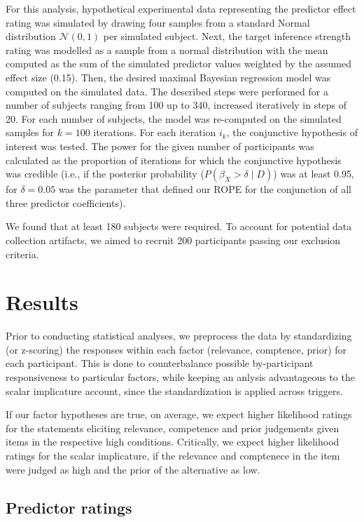 \documentclass{sp}
\begin{document}
For this analysis, hypothetical experimental data representing the predictor effect rating was simulated by drawing four samples from a standard Normal distribution $\mathcal{N}(0,1)$ per simulated subject. Next, the target inference strength rating was modelled as a sample from a normal distribution with the mean computed as the sum of the simulated predictor values weighted by the assumed effect size (0.15). Then, the desired maximal Bayesian regression model was computed on the simulated data. The described steps were performed for a number of subjects ranging from 100 up to 340, increased iteratively in steps of 20. For each number of subjects, the model was re-computed on the simulated samples for $k=100$ iterations. For each iteration $i_k$, the conjunctive hypothesis of interest was tested. 
The power for the given number of participants was calculated as the proportion of iterations for which the conjunctive hypothesis was credible (i.e., if the posterior probability ($P(\beta_X > \delta \mid D)$) was at least 0.95, for $\delta = 0.05$ was the parameter that defined our ROPE for the conjunction of all three predictor coefficients).

We found that at least 180 subjects were required. To account for potential data collection artifacts, we aimed to recruit 200 participants passing our exclusion criteria.

\section{Results}
Prior to conducting statistical analyses, we preprocess the data by standardizing (or z-scoring) the responses within each factor (relevance, comptence, prior) for each participant. This is done to counterbalance possible by-participant responsiveness to particular factors, while keeping an anlysis advantageous to the scalar implicature account, since the standardization is applied across triggers. 

If our factor hypotheses are true, on average, we expect higher likelihood ratings for the statements eliciting relevance, competence and prior judgements given items in the respective high conditions. Critically, we expect higher likelihood ratings for the scalar implicature, if the relevance and comptenece in the item were judged as high and the prior of the alternative as low.

\subsection{Predictor ratings}
\end{document}
